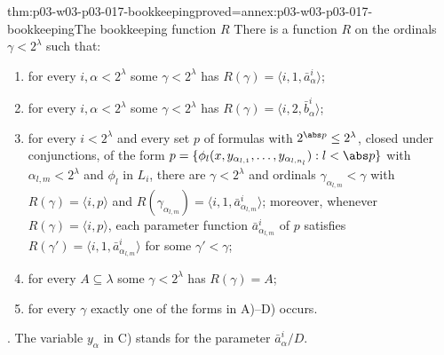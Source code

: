 \begin{hblemma}{thm:p03-w03-p03-017-bookkeeping}{proved=annex:p03-w03-p03-017-bookkeeping}{The bookkeeping function \(R\)}
There is a function \(R\) on the ordinals \(\gamma<2^\lambda\) such that:
\begin{enumerate}
  \item[A)] for every \(i,\alpha<2^\lambda\) some \(\gamma<2^\lambda\) has
        \(R(\gamma)=\langle i,1,\bar a^i_\alpha\rangle\);
  \item[B)] for every \(i,\alpha<2^\lambda\) some \(\gamma<2^\lambda\) has
        \(R(\gamma)=\langle i,2,\bar b^i_\alpha\rangle\);
  \item[C)] for every \(i<2^\lambda\) and every set \(p\) of formulas with
        \(2^{\abs p}\le2^\lambda\), closed under conjunctions, of the form
        \(p=\{\phi_l(x,y_{\alpha_{l,1}},\ldots,y_{\alpha_{l,n_l}}):l<\abs p\}\)
        with \(\alpha_{l,m}<2^\lambda\) and \(\phi_l\) in \(L_i\), there are
        \(\gamma<2^\lambda\) and ordinals \(\gamma_{\alpha_{l,m}}<\gamma\)
        with \(R(\gamma)=\langle i,p\rangle\) and
        \(R(\gamma_{\alpha_{l,m}})=\langle i,1,\bar a^i_{\alpha_{l,m}}\rangle\);
        moreover, whenever \(R(\gamma)=\langle i,p\rangle\), each parameter
        function \(\bar a^i_{\alpha_{l,m}}\) of \(p\) satisfies
        \(R(\gamma')=\langle i,1,\bar a^i_{\alpha_{l,m}}\rangle\) for some
        \(\gamma'<\gamma\);
  \item[D)] for every \(A\subseteq\lambda\) some \(\gamma<2^\lambda\) has
        \(R(\gamma)=A\);
  \item[E)] for every \(\gamma\) exactly one of the forms in A)--D) occurs.
\end{enumerate}
\cite[pp.~230--231]{Shelah1971Ultrapowers}.  The variable \(y_\alpha\) in C)
stands for the parameter \(\bar a^i_\alpha/D\).
\end{hblemma}

